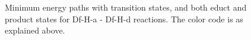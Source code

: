\documentclass[11pt,DIV=13,BCOR=5mm,a4paper,headinclude]{scrbook}
\begin{document}
\begin{figure} [!ht]
\centering
{}
 \quad
{}
\caption{Minimum energy paths with transition states, and both educt and product states for Df-H-a - Df-H-d reactions.
The color code is as explained above.}
       \label{mep2}
\end{figure}
\end{document}

